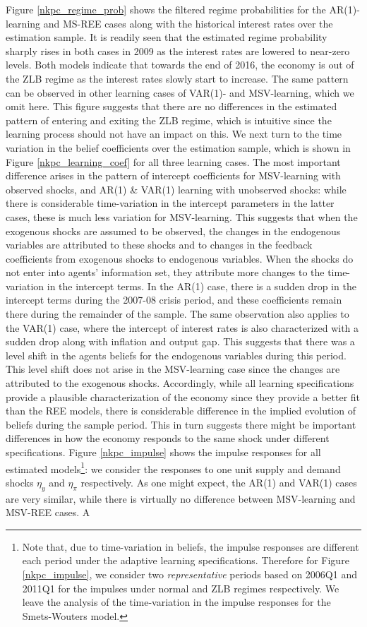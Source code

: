 \documentclass[12pt,reqno]{article}
\numberwithin{equation}{section}
\begin{document}
\noindent
Figure \ref{nkpc_regime_prob} shows the filtered regime probabilities for the AR(1)-learning and MS-REE cases along with the historical interest rates over the estimation sample. It is readily seen that the estimated regime probability sharply rises in both cases in 2009 as the interest rates are lowered to near-zero levels. Both models indicate that towards the end of 2016, the economy is out of the ZLB regime as the interest rates slowly start to increase. The same pattern can be observed in other learning cases of VAR(1)- and MSV-learning, which we omit here. This figure suggests that there are no differences in the estimated pattern of entering and exiting the ZLB regime, which is intuitive since the learning process should not have an impact on this. We next turn to the time variation in the belief coefficients over the estimation sample, which is shown in Figure \ref{nkpc_learning_coef} for all three learning cases. The most important difference arises in the pattern of intercept coefficients for MSV-learning with observed shocks, and AR(1) \& VAR(1) learning with unobserved shocks: while there is considerable time-variation in the intercept parameters in the latter cases, these is much less variation for MSV-learning. This suggests that when the exogenous shocks are assumed to be observed, the changes in the endogenous variables are attributed to these shocks and to changes in the feedback coefficients from exogenous shocks to endogenous variables. When the shocks do not enter into agents' information set, they attribute more changes to the time-variation in the intercept terms. In the AR(1) case, there is a sudden drop in the intercept terms during the 2007-08 crisis period, and these coefficients remain there during the remainder of the sample. The same observation also applies to the VAR(1) case, where the intercept of interest rates is also characterized with a sudden drop along with inflation and output gap. This suggests that there was a level shift in the agents beliefs for the endogenous variables during this period. This level shift does not arise in the MSV-learning case since the changes are attributed to the exogenous shocks. Accordingly, while all learning specifications provide a plausible characterization of the economy since they provide a better fit than the REE models, there is considerable difference in the implied evolution of beliefs during the sample period. This in turn suggests there might be important differences in how the economy responds to the same shock under different specifications.  Figure \ref{nkpc_impulse} shows the impulse responses for all estimated models\footnote{Note that, due to time-variation in beliefs, the impulse responses are different each period under the adaptive learning specifications. Therefore for Figure \ref{nkpc_impulse}, we consider two \textit{representative} periods based on 2006Q1 and 2011Q1 for the impulses under normal and ZLB regimes respectively. We leave the analysis of the time-variation in the impulse responses for the Smets-Wouters model.}: we consider the responses to one unit supply and demand shocks $\eta_y$ and $\eta_{\pi}$ respectively. As one might expect, the AR(1) and VAR(1) cases are very similar, while there is virtually no difference between MSV-learning and MSV-REE cases. A 
\end{document}
